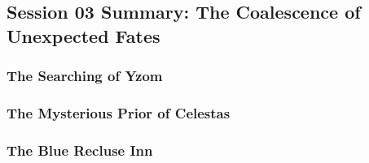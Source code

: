 \subsection{Session 03 Summary: The Coalescence of Unexpected Fates}

\subsubsection{The Searching of Yzom}



\subsubsection{The Mysterious Prior of Celestas}



\subsubsection{The Blue Recluse Inn}